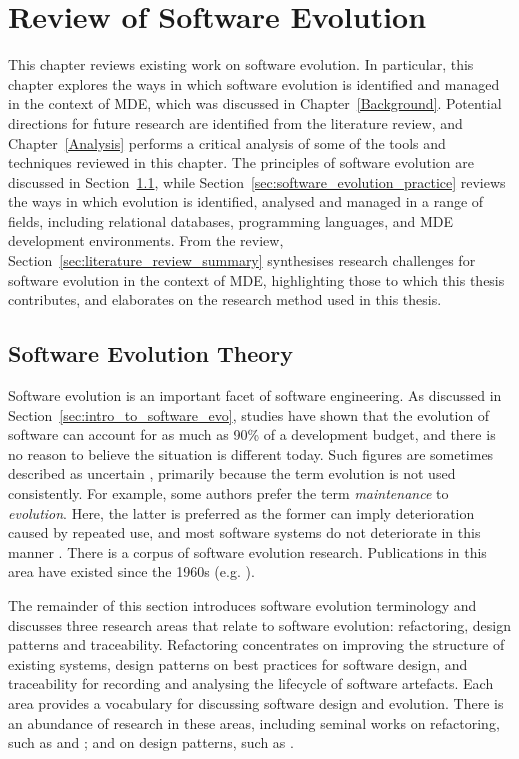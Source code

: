 
\chapter{Review of Software Evolution}
\label{LiteratureReview}
This chapter reviews existing work on software evolution. In particular, this chapter explores the ways in which software evolution is identified and managed in the context of MDE, which was discussed in Chapter~\ref{Background}. Potential directions for future research are identified from the literature review, and Chapter~\ref{Analysis} performs a critical analysis of some of the tools and techniques reviewed in this chapter. The principles of software evolution are discussed in Section~\ref{sec:software_evolution_theory}, while Section~\ref{sec:software_evolution_practice} reviews the ways in which evolution is identified, analysed and managed in a range of fields, including relational databases, programming languages, and MDE development environments. From the review, Section~\ref{sec:literature_review_summary} synthesises research challenges for software evolution in the context of MDE, highlighting those to which this thesis contributes, and elaborates on the research method used in this thesis.

\section{Software Evolution Theory}
\label{sec:software_evolution_theory}
Software evolution is an important facet of software engineering. As discussed in Section~\ref{sec:intro_to_software_evo}, studies \cite{erlikh00leveraging,moad90maintaining} have shown that the evolution of software can account for as much as 90\% of a development budget, and there is no reason to believe the situation is different today. Such figures are sometimes described as uncertain \cite[ch. 21]{sommerville06software}, primarily because the term evolution is not used consistently. For example, some authors prefer the term \emph{maintenance} to \emph{evolution}. Here, the latter is preferred as the former can imply deterioration caused by repeated use, and most software systems do not deteriorate in this manner \cite{ramil00cost}. There is a corpus of software evolution research. Publications in this area have existed since the 1960s (e.g. \cite{lehman69programming}).

The remainder of this section introduces software evolution terminology and discusses three research areas that relate to software evolution: refactoring, design patterns and traceability. Refactoring concentrates on improving the structure of existing systems, design patterns on best practices for software design, and traceability for recording and analysing the lifecycle of software artefacts. Each area provides a vocabulary for discussing software design and evolution. There is an abundance of research in these areas, including seminal works on refactoring, such as \cite{opdyke92refactoring} and \cite{fowler99refactoring}; and on design patterns, such as \cite{gamma95patterns}.

